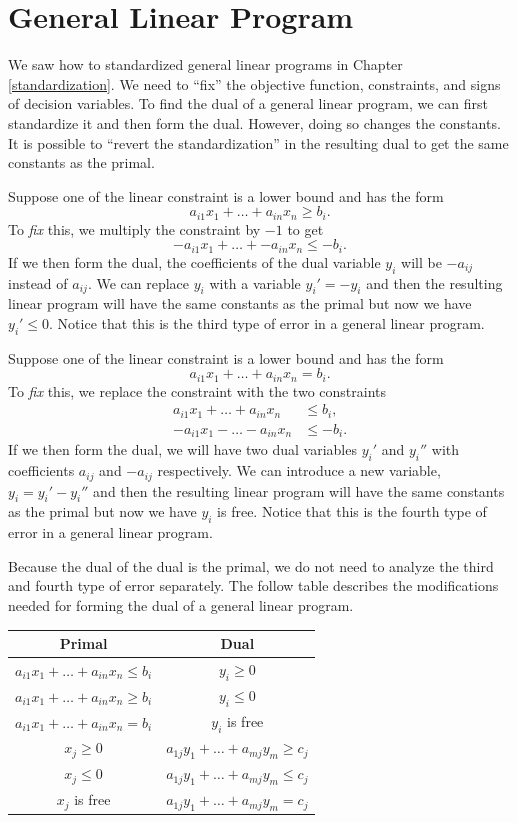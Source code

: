 \documentclass[
]{book}
\theoremstyle{definition}
\theoremstyle{definition}
\theoremstyle{definition}
\theoremstyle{definition}
\theoremstyle{remark}
\begin{document}
\hypertarget{general-linear-program}{%
\section{General Linear Program}\label{general-linear-program}}

We saw how to standardized general linear programs in Chapter \ref{standardization}. We need to ``fix'' the objective function, constraints, and signs of decision variables. To find the dual of a general linear program, we can first standardize it and then form the dual. However, doing so changes the constants. It is possible to ``revert the standardization'' in the resulting dual to get the same constants as the primal.

Suppose one of the linear constraint is a lower bound and has the form \[a_{i1} x_1 + \dots + a_{in} x_n \geq b_i.\]
To \emph{fix} this, we multiply the constraint by \(-1\) to get \[-a_{i1} x_1 + \dots + - a_{in} x_n \leq -b_i.\]
If we then form the dual, the coefficients of the dual variable \(y_i\) will be \(-a_{ij}\) instead of \(a_{ij}\).
We can replace \(y_i\) with a variable \(y_i' = -y_i\) and then the resulting linear program will have the same constants as the primal but now we have \(y_i' \le 0\).
Notice that this is the third type of error in a general linear program.

Suppose one of the linear constraint is a lower bound and has the form \[a_{i1} x_1 + \dots + a_{in} x_n = b_i.\]
To \emph{fix} this, we replace the constraint with the two constraints
\begin{align*}
  a_{i1} x_1 + \dots + a_{in} x_n &\leq b_i, \\
  -a_{i1} x_1 - \dots - a_{in} x_n &\leq -b_i.
\end{align*}
If we then form the dual, we will have two dual variables \(y_i'\) and \(y_i''\) with coefficients \(a_{ij}\) and \(-a_{ij}\) respectively.
We can introduce a new variable, \(y_i = y_i' - y_i''\) and then the resulting linear program will have the same constants as the primal but now we have \(y_i\) is free.
Notice that this is the fourth type of error in a general linear program.

Because the dual of the dual is the primal, we do not need to analyze the third and fourth type of error separately.
The follow table describes the modifications needed for forming the dual of a general linear program.

\begin{longtable}[]{@{}cc@{}}
\toprule
Primal & Dual \\
\midrule
\endhead
\(a_{i1} x_1 + \dots + a_{in} x_n \le b_i\) & \(y_i \ge 0\) \\
\(a_{i1} x_1 + \dots + a_{in} x_n \ge b_i\) & \(y_i \le 0\) \\
\(a_{i1} x_1 + \dots + a_{in} x_n = b_i\) & \(y_i\) is free \\
\(x_j \ge 0\) & \(a_{1j}y_1 + \dots + a_{mj} y_m \ge c_j\) \\
\(x_j \le 0\) & \(a_{1j}y_1 + \dots + a_{mj} y_m \le c_j\) \\
\(x_j\) is free & \(a_{1j}y_1 + \dots + a_{mj} y_m = c_j\) \\
\bottomrule
\end{longtable}
\end{document}
